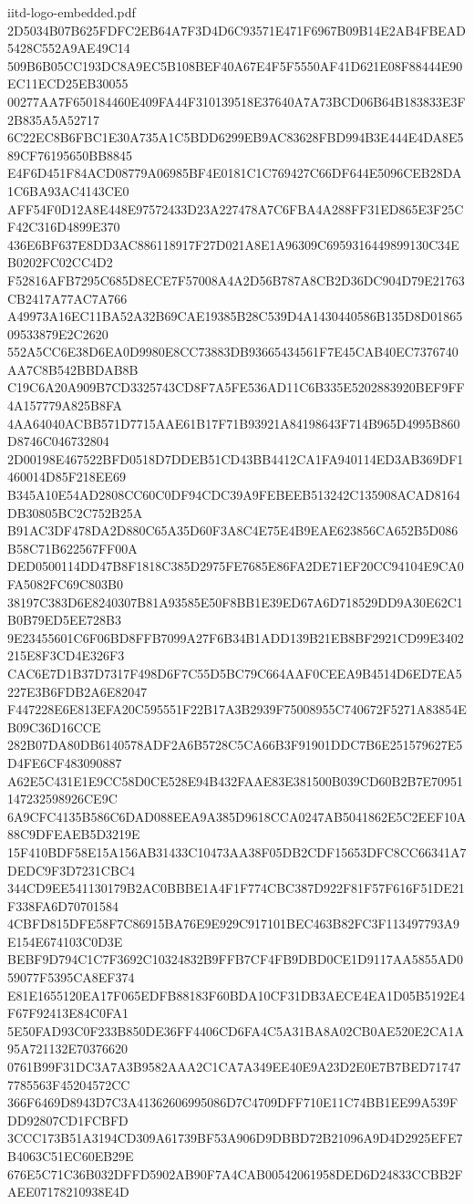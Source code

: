 \begin{filecontents*}[overwrite]{iitd-logo-embedded.pdf}
2D5034B07B625FDFC2EB64A7F3D4D6C93571E471F6967B09B14E2AB4FBEAD5428C552A9AE49C14
509B6B05CC193DC8A9EC5B108BEF40A67E4F5F5550AF41D621E08F88444E90EC11ECD25EB30055
00277AA7F650184460E409FA44F310139518E37640A7A73BCD06B64B183833E3F2B835A5A52717
6C22EC8B6FBC1E30A735A1C5BDD6299EB9AC83628FBD994B3E444E4DA8E589CF76195650BB8845
E4F6D451F84ACD08779A06985BF4E0181C1C769427C66DF644E5096CEB28DA1C6BA93AC4143CE0
AFF54F0D12A8E448E97572433D23A227478A7C6FBA4A288FF31ED865E3F25CF42C316D4899E370
436E6BF637E8DD3AC886118917F27D021A8E1A96309C6959316449899130C34EB0202FC02CC4D2
F52816AFB7295C685D8ECE7F57008A4A2D56B787A8CB2D36DC904D79E21763CB2417A77AC7A766
A49973A16EC11BA52A32B69CAE19385B28C539D4A1430440586B135D8D0186509533879E2C2620
552A5CC6E38D6EA0D9980E8CC73883DB93665434561F7E45CAB40EC7376740AA7C8B542BBDAB8B
C19C6A20A909B7CD3325743CD8F7A5FE536AD11C6B335E5202883920BEF9FF4A157779A825B8FA
4AA64040ACBB571D7715AAE61B17F71B93921A84198643F714B965D4995B860D8746C046732804
2D00198E467522BFD0518D7DDEB51CD43BB4412CA1FA940114ED3AB369DF1460014D85F218EE69
B345A10E54AD2808CC60C0DF94CDC39A9FEBEEB513242C135908ACAD8164DB30805BC2C752B25A
B91AC3DF478DA2D880C65A35D60F3A8C4E75E4B9EAE623856CA652B5D086B58C71B622567FF00A
DED0500114DD47B8F1818C385D2975FE7685E86FA2DE71EF20CC94104E9CA0FA5082FC69C803B0
38197C383D6E8240307B81A93585E50F8BB1E39ED67A6D718529DD9A30E62C1B0B79ED5EE728B3
9E23455601C6F06BD8FFB7099A27F6B34B1ADD139B21EB8BF2921CD99E3402215E8F3CD4E326F3
CAC6E7D1B37D7317F498D6F7C55D5BC79C664AAF0CEEA9B4514D6ED7EA5227E3B6FDB2A6E82047
F447228E6E813EFA20C595551F22B17A3B2939F75008955C740672F5271A83854EB09C36D16CCE
282B07DA80DB6140578ADF2A6B5728C5CA66B3F91901DDC7B6E251579627E5D4FE6CF483090887
A62E5C431E1E9CC58D0CE528E94B432FAAE83E381500B039CD60B2B7E70951147232598926CE9C
6A9CFC4135B586C6DAD088EEA9A385D9618CCA0247AB5041862E5C2EEF10A88C9DFEAEB5D3219E
15F410BDF58E15A156AB31433C10473AA38F05DB2CDF15653DFC8CC66341A7DEDC9F3D7231CBC4
344CD9EE541130179B2AC0BBBE1A4F1F774CBC387D922F81F57F616F51DE21F338FA6D70701584
4CBFD815DFE58F7C86915BA76E9E929C917101BEC463B82FC3F113497793A9E154E674103C0D3E
BEBF9D794C1C7F3692C10324832B9FFB7CF4FB9DBD0CE1D9117AA5855AD059077F5395CA8EF374
E81E1655120EA17F065EDFB88183F60BDA10CF31DB3AECE4EA1D05B5192E4F67F92413E84C0FA1
5E50FAD93C0F233B850DE36FF4406CD6FA4C5A31BA8A02CB0AE520E2CA1A95A721132E70376620
0761B99F31DC3A7A3B9582AAA2C1CA7A349EE40E9A23D2E0E7B7BED717477785563F45204572CC
366F6469D8943D7C3A41362606995086D7C4709DFF710E11C74BB1EE99A539FDD92807CD1FCBFD
3CCC173B51A3194CD309A61739BF53A906D9DBBD72B21096A9D4D2925EFE7B4063C51EC60EB29E
676E5C71C36B032DFFD5902AB90F7A4CAB00542061958DED6D24833CCBB2FAEE07178210938E4D

\end{filecontents*}
